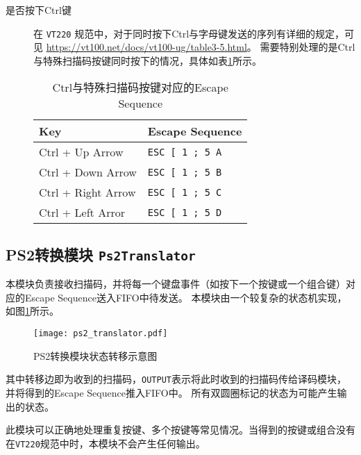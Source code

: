 \begin{description}
    \item[是否按下Ctrl键] 在 \texttt{VT220} 规范中，对于同时按下Ctrl与字母键发送的序列有详细的规定，可见 \url{https://vt100.net/docs/vt100-ug/table3-5.html}。
    需要特别处理的是Ctrl与特殊扫描码按键同时按下的情况，具体如表\ref{tab:ctrl_scancode}所示。

    \begin{table}[htbp]
        \centering
        \caption{Ctrl与特殊扫描码按键对应的Escape Sequence}
        \label{tab:ctrl_scancode}
        \begin{tabular}{|l|l|}
        \hline
        \textbf{Key}           & \textbf{Escape Sequence}  \\ \hline
        Ctrl + Up Arrow        & \texttt{ESC {[} 1 ; 5 A}  \\ \hline
        Ctrl + Down Arrow      & \texttt{ESC {[} 1 ; 5 B}  \\ \hline
        Ctrl + Right Arrow     & \texttt{ESC {[} 1 ; 5 C}  \\ \hline
        Ctrl + Left Arror      & \texttt{ESC {[} 1 ; 5 D}  \\ \hline
        \end{tabular}
    \end{table}
 \end{description}

 \subsection{PS2转换模块 \texttt{Ps2Translator}}
 本模块负责接收扫描码，并将每一个键盘事件（如按下一个按键或一个组合键）对应的Escape Sequence送入FIFO中待发送。
 本模块由一个较复杂的状态机实现，如图\ref{fig:ps2_translator}所示。

 \begin{figure}[htbp]
    \centering
    \texttt{[image: ps2\_translator.pdf]}
    \caption{PS2转换模块状态转移示意图}
    \label{fig:ps2_translator}
\end{figure}

其中转移边即为收到的扫描码，\texttt{OUTPUT}表示将此时收到的扫描码传给译码模块，并将得到的Escape Sequence推入FIFO中。
所有双圆圈标记的状态为可能产生输出的状态。

此模块可以正确地处理重复按键、多个按键等常见情况。当得到的按键或组合没有在\texttt{VT220}规范中时，本模块不会产生任何输出。